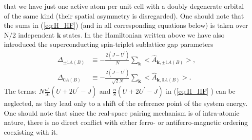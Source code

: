 \documentclass[aps,prb,showpacs,reprint]{revtex4-1}
\begin{document}
that we have just one active atom per unit cell with a doubly degenerate orbital
of the same kind (their spatial asymmetry is disregarded). One should note
that the sums in (\ref{eq:H_HF}) (and in all
corresponding equations below) is taken over N/2 independent $\mathbf{k}$
states. In the Hamiltonian written above we have also introduced the
superconducting spin-triplet sublattice gap parameters 
\begin{equation}
\begin{split}
  \Delta_{\pm
1A(B)}&\equiv-\frac{2(J-U^{\prime})}{N}\sum_{\mathbf{k}}<\hat{A}_{\mathbf{k},
\pm 1A(B)}>,\\
\Delta_{0A(B)}&\equiv-\frac{2(J-U^{\prime})}{\sqrt{2}N}\sum_{\mathbf{k}}<\hat{A
} _{\mathbf {k},0A(B)}>.
\label{eq:pairing_def}
\end{split}
\end{equation}
The terms: $N\frac{n^2}{16}(U+2U^{\prime}-J)$ and
$\frac{n}{8}(U+2U^{\prime}-J)$ in (\ref{eq:H_HF} ) can be neglected, as
they lead only to a shift of
the reference point of the system energy. One should note that since
the real-space pairing mechanism is of intra-atomic nature, there is no direct
conflict with either ferro- or antiferro-magnetic ordering coexisting with it.   

\end{document}
